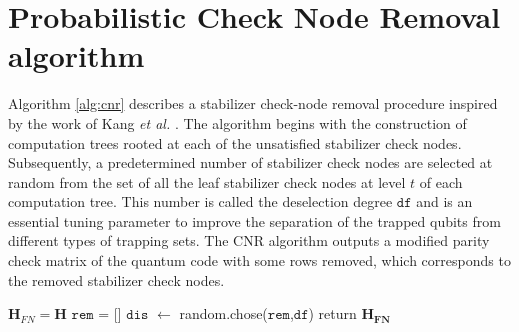 \documentclass[%
 reprint,
 amsmath,amssymb,
 aps,
pra,
showkeys,
]{revtex4-2}
\begin{document}
\section{Probabilistic Check Node Removal algorithm}
\label{ap:cnr}
Algorithm \ref{alg:cnr} describes a stabilizer check-node removal procedure inspired by the work of Kang \emph{et al.} \cite{kang2015breaking}. 
The algorithm begins with the construction of computation trees rooted at each of the unsatisfied stabilizer check nodes. 
Subsequently, a predetermined number of stabilizer check nodes are selected at random from the set of all the leaf stabilizer check nodes at level $t$ of each computation tree.
This number is called the deselection degree $\mathtt{df}$ and is an essential tuning parameter to improve the separation of the trapped qubits from different types of trapping sets.
The CNR algorithm outputs a modified parity check matrix of the quantum code with some rows removed, which corresponds to the removed stabilizer check nodes.
\begin{algorithm}
\caption{Check Node Removal (CNR)}\label{alg:cnr}
$\mathbf{H}_{FN} = \mathbf{H}$
$\mathtt{rem}$ = []
$\mathtt{dis}$ $\gets$ random.chose($\mathtt{rem}$,$\mathtt{df}$)\;
return $\mathbf{H_{FN}}$ 
\end{algorithm}
\end{document}
